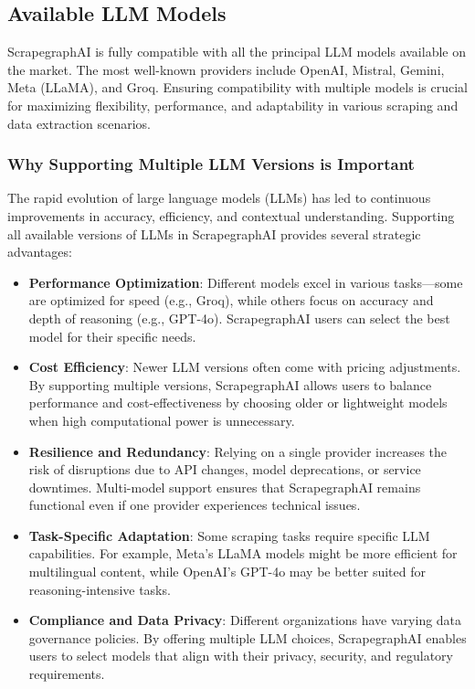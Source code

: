 \subsection{Available LLM Models}

ScrapegraphAI is fully compatible with all the principal LLM models available on the market. The most well-known providers include OpenAI, Mistral, Gemini, Meta (LLaMA), and Groq. Ensuring compatibility with multiple models is crucial for maximizing flexibility, performance, and adaptability in various scraping and data extraction scenarios.

\subsubsection{Why Supporting Multiple LLM Versions is Important}

The rapid evolution of large language models (LLMs) has led to continuous improvements in accuracy, efficiency, and contextual understanding. Supporting all available versions of LLMs in ScrapegraphAI provides several strategic advantages:

\begin{itemize}
    \item \textbf{Performance Optimization}: Different models excel in various tasks—some are optimized for speed (e.g., Groq), while others focus on accuracy and depth of reasoning (e.g., GPT-4o). ScrapegraphAI users can select the best model for their specific needs.
    \item \textbf{Cost Efficiency}: Newer LLM versions often come with pricing adjustments. By supporting multiple versions, ScrapegraphAI allows users to balance performance and cost-effectiveness by choosing older or lightweight models when high computational power is unnecessary.
    \item \textbf{Resilience and Redundancy}: Relying on a single provider increases the risk of disruptions due to API changes, model deprecations, or service downtimes. Multi-model support ensures that ScrapegraphAI remains functional even if one provider experiences technical issues.
    \item \textbf{Task-Specific Adaptation}: Some scraping tasks require specific LLM capabilities. For example, Meta’s LLaMA models might be more efficient for multilingual content, while OpenAI’s GPT-4o may be better suited for reasoning-intensive tasks.
    \item \textbf{Compliance and Data Privacy}: Different organizations have varying data governance policies. By offering multiple LLM choices, ScrapegraphAI enables users to select models that align with their privacy, security, and regulatory requirements.
\end{itemize}

